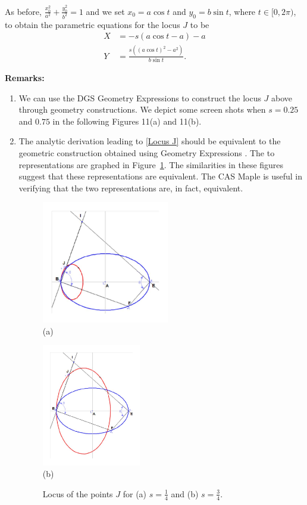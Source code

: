 \documentclass[12pt,a4paper]{article}%
\begin{document}
As before, $\frac{x_{0}^{2}}{a^{2}}+\frac{y_{0}^{2}}{b^{2}}=1$
and we set $x_{0}=a\cos t$ and $y_{0}=b\sin t$, where $t\in[0,2\pi)$,
to obtain the parametric equations for the locus $J$ to be
\begin{align}
X  & =-s( a\cos t-a) -a                                   \label{Locus J}\\
Y  & =\frac{s\left((a\cos t)^{2}-a^{2}\right)  }{b\sin t}.\nonumber
\end{align}

\textbf{Remarks: }
\begin{enumerate}
\item We can use the DGS Geometry Expressions \cite{GE} to construct
      the locus $J$ above through geometry constructions.
      We depict some screen shots when $s=0.25$ and $0.75$ in the
      following Figures 11(a) and 11(b).

\item
The analytic derivation leading to \ref{Locus J} should be equivalent to
the geometric construction obtained using Geometry Expressions \cite{GE}.
The to representations are graphed in Figure~\ref{fig11}. The similarities
in these figures suggest that these representations are equivalent.
The CAS Maple \cite{Maple} is useful in verifying that the two representations
are, in fact, equivalent.

\begin{figure}[htpb]
\begin{center}
\parbox[b]{2.2in}{\begin{center}
\includegraphics[height=2.1in,keepaspectratio]{PJH75I1K.pdf}
 \\ (a)
\end{center}}
\qquad
\parbox[b]{2.2in}{\begin{center}
\includegraphics[height=2.1in,keepaspectratio]{PJH75I1L.pdf}
 \\ (b)
\end{center}}
\end{center}
\caption{Locus of the points $J$ for (a) $s=\frac{1}{4}$ and (b) $s=\frac{3}{4}$.}
\label{fig11}
\end{figure}

\end{enumerate}
\end{document}
